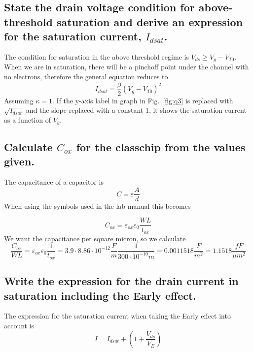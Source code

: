\subsection{State the drain voltage condition for above-threshold saturation and derive an expression for the saturation current, \(I_{dsat}\).}

The condition for saturation in the above threshold regime is \(V_{ds} \geq V_g - V_{T0}\).
When we are in saturation, there will be a pinchoff point under the channel with no electrons, therefore the
general equation reduces to 
\begin{equation*}
    I_{dsat} = \frac{\beta}{2}\left(V_g-V_{T0}\right)^2
\end{equation*}
Assuming \(\kappa = 1\). If the y-axis label in graph in Fig.~\ref{fig:q3} is replaced with \(\sqrt{I_{dsat}}\) and the slope replaced with a constant 
1, it shows the saturation current as a function of \(V_g\).

\subsection{Calculate \(C_{ox}\) for the classchip from the values given.}

The capacitance of a capacitor is 
\begin{equation*}
    C=\varepsilon\frac{A}{d}
\end{equation*}
When using the symbols used in the lab manual this becomes

\begin{equation*}
    C_{ox} = \varepsilon_{ox}\varepsilon_0\frac{WL}{t_{ox}}
\end{equation*}
We want the capacitance per square micron, so we calculate
\begin{equation*}
    \frac{C_{ox}}{WL} = \varepsilon_{ox}\varepsilon_0\frac{1}{t_{ox}} = 3.9\cdot8.86\cdot10^{-12}\frac{F}{m}\frac{1}{300\cdot10^{-10}m} = 0.0011518 \frac{F}{m^2} = 1.1518 \frac{fF}{\mu m^2}
\end{equation*}

\subsection{Write the expression for the drain current in saturation including the Early effect.}
The expression for the saturation current when taking the Early effect into account is
\begin{equation*}
    I = I_{dsat}+\left(1+\frac{V_{ds}}{V_E}\right)
\end{equation*}

